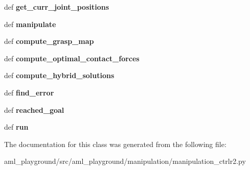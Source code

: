 \begin{DoxyCompactItemize}
\item 
\hypertarget{classaml__playground_1_1manipulation_1_1manipulation__ctrlr2_1_1_man_cntrlr_a1f62ef13d71945eb23b86ffe522819ca}{def {\bfseries get\-\_\-curr\-\_\-joint\-\_\-positions}}\label{classaml__playground_1_1manipulation_1_1manipulation__ctrlr2_1_1_man_cntrlr_a1f62ef13d71945eb23b86ffe522819ca}

\item 
\hypertarget{classaml__playground_1_1manipulation_1_1manipulation__ctrlr2_1_1_man_cntrlr_a87786d219331cd51c528789c8ff7687e}{def {\bfseries manipulate}}\label{classaml__playground_1_1manipulation_1_1manipulation__ctrlr2_1_1_man_cntrlr_a87786d219331cd51c528789c8ff7687e}

\item 
\hypertarget{classaml__playground_1_1manipulation_1_1manipulation__ctrlr2_1_1_man_cntrlr_a1e319667c7c772065920f389e0060e9c}{def {\bfseries compute\-\_\-grasp\-\_\-map}}\label{classaml__playground_1_1manipulation_1_1manipulation__ctrlr2_1_1_man_cntrlr_a1e319667c7c772065920f389e0060e9c}

\item 
\hypertarget{classaml__playground_1_1manipulation_1_1manipulation__ctrlr2_1_1_man_cntrlr_a25d861b0412f7d80207bc59d1609ece6}{def {\bfseries compute\-\_\-optimal\-\_\-contact\-\_\-forces}}\label{classaml__playground_1_1manipulation_1_1manipulation__ctrlr2_1_1_man_cntrlr_a25d861b0412f7d80207bc59d1609ece6}

\item 
\hypertarget{classaml__playground_1_1manipulation_1_1manipulation__ctrlr2_1_1_man_cntrlr_afa7b69994187f3a48523a6ab11da1e63}{def {\bfseries compute\-\_\-hybrid\-\_\-solutions}}\label{classaml__playground_1_1manipulation_1_1manipulation__ctrlr2_1_1_man_cntrlr_afa7b69994187f3a48523a6ab11da1e63}

\item 
\hypertarget{classaml__playground_1_1manipulation_1_1manipulation__ctrlr2_1_1_man_cntrlr_ab6e7a43f6f12f5476d2168a261cd87ae}{def {\bfseries find\-\_\-error}}\label{classaml__playground_1_1manipulation_1_1manipulation__ctrlr2_1_1_man_cntrlr_ab6e7a43f6f12f5476d2168a261cd87ae}

\item 
\hypertarget{classaml__playground_1_1manipulation_1_1manipulation__ctrlr2_1_1_man_cntrlr_ae07da703ff0c90b94d41311fab24a51f}{def {\bfseries reached\-\_\-goal}}\label{classaml__playground_1_1manipulation_1_1manipulation__ctrlr2_1_1_man_cntrlr_ae07da703ff0c90b94d41311fab24a51f}

\item 
\hypertarget{classaml__playground_1_1manipulation_1_1manipulation__ctrlr2_1_1_man_cntrlr_a476cf90ac5691ef489b4e37d1fba284b}{def {\bfseries run}}\label{classaml__playground_1_1manipulation_1_1manipulation__ctrlr2_1_1_man_cntrlr_a476cf90ac5691ef489b4e37d1fba284b}

\end{DoxyCompactItemize}


The documentation for this class was generated from the following file\-:\begin{DoxyCompactItemize}
\item 
aml\-\_\-playground/src/aml\-\_\-playground/manipulation/manipulation\-\_\-ctrlr2.\-py\end{DoxyCompactItemize}
